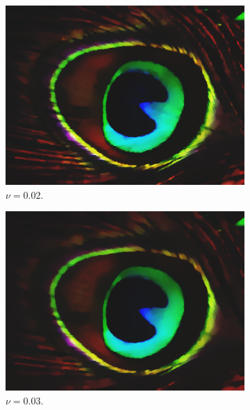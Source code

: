 \documentclass[abstracton]{scrreprt}
\begin{document}
\begin{figure}[!ht]
\begin{subfigure}[b]{0.16\textwidth}
                    \includegraphics[width=\textwidth]{img/segmentation/cr/002peacock-feather.png}
                    \caption{$\nu = 0.02$.}
                \end{subfigure}
                \begin{subfigure}[b]{0.16\textwidth}
                    \includegraphics[width=\textwidth]{img/segmentation/cr/003peacock-feather.png}
                    \caption{$\nu = 0.03$.}
                \end{subfigure}
                \begin{subfigure}[b]{0.16\textwidth}

\end{subfigure}
\end{figure}
\end{document}
